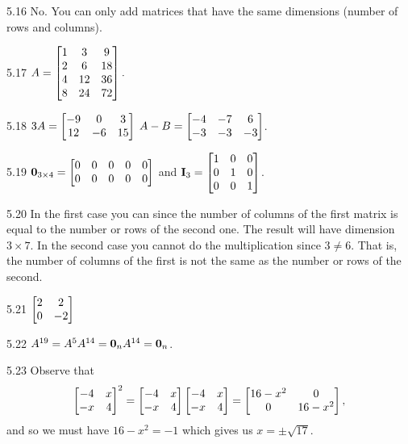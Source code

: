 \begin{RequAnswer}{5.16}
No. You can only add matrices that have the same
dimensions (number of rows and columns).
\end{RequAnswer}
\begin{RequAnswer}{5.17}
 $A = \begin{bmatrix}
1 & 3 & 9 \cr
2 & 6 & 18 \cr
4 & 12 & 36 \cr
8 & 24 & 72 \cr \end{bmatrix}.$
\end{RequAnswer}
\begin{RequAnswer}{5.18}
$3A=\begin{bmatrix}
-9& 0 & 3 \cr
12 & -6 & 15 \cr\end{bmatrix}$
$A-B=\begin{bmatrix}
-4& -7 & 6 \cr
-3 & -3 & -3 \cr\end{bmatrix}$.
\end{RequAnswer}
\begin{RequAnswer}{5.19}
${\bf 0}_{3\times 4}=
\begin{bmatrix}0 & 0 & 0 & 0 &0 \cr
0 & 0 & 0 & 0 &0\cr \end{bmatrix}$
and
 ${\bf I}_3=
\begin{bmatrix}
1 & 0 & 0 \cr
0 & 1 & 0 \cr
0 & 0 & 1 \cr\end{bmatrix}$.
\end{RequAnswer}
\begin{RequAnswer}{5.20}
In the first case you can since the number of columns of
the first matrix is equal to the number or rows of the second one.
The result will have dimension $3\times 7$.
In the second case you cannot do the multiplication since $3\neq 6$.
That is, the number of columns of the first is not the same
as the number or rows of the second.
\end{RequAnswer}
\begin{RequAnswer}{5.21}
$\begin{bmatrix} 2 & 2 \cr 0 & -2 \cr
\end{bmatrix}$
\end{RequAnswer}
\begin{RequAnswer}{5.22}
$A^{19}=A^5A^{14}={\bf 0}_n A^{14}={\bf 0}_n$.
\end{RequAnswer}
\begin{RequAnswer}{5.23}
 Observe that $$
\begin{bmatrix} -4 & x \cr -x & 4
\end{bmatrix}^2 =\begin{bmatrix} -4 & x \cr -x & 4
\end{bmatrix}\begin{bmatrix} -4 & x \cr -x & 4
\end{bmatrix} =  \begin{bmatrix} 16 - x^2 & 0 \cr 0 & 16 - x^2 \end{bmatrix}, $$ and so we must have
$16 - x^2 = -1$ which gives us $x = \pm\sqrt{17}$.
\end{RequAnswer}
